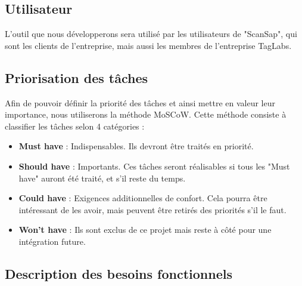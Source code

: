 \documentclass[12pt,titlepage,french]{article}
\begin{document}
\subsection*{Utilisateur}
L'outil que nous développerons sera utilisé par les utilisateurs de "ScanSap", qui sont les clients de l'entreprise, mais aussi les membres de l'entreprise TagLabs.

\subsection*{Priorisation des tâches}

Afin de pouvoir définir la priorité des tâches et ainsi mettre en valeur leur importance, nous utiliserons la méthode MoSCoW. Cette méthode consiste à classifier les tâches selon 4 catégories :

\begin{itemize}
    \item \textbf{Must have} : Indispensables. Ils devront être traités en priorité.
    \item \textbf{Should have} : Importants. Ces tâches seront réalisables si tous les "Must have" auront été traité, et s'il reste du temps.
    \item \textbf{Could have} : Exigences additionnelles de confort. Cela pourra être intéressant de les avoir, mais peuvent être retirés des priorités s'il le faut.
    \item \textbf{Won't have} : Ils sont exclus de ce projet mais reste à côté pour une intégration future.
\end{itemize}

\subsection*{Description des besoins fonctionnels}
\end{document}
